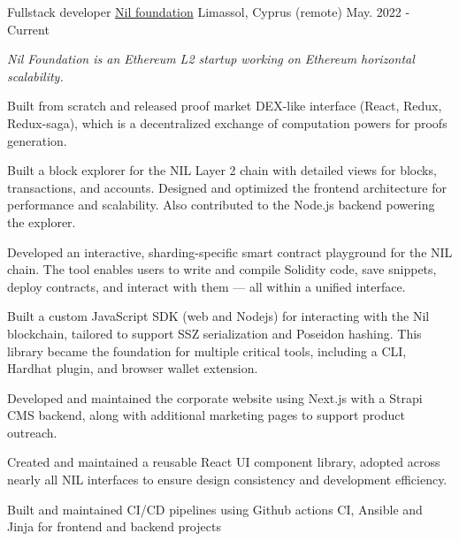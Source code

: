 

\begin{cventries}

  \cventry
    {Fullstack developer} %
    {\href{https://nil.foundation}{Nil foundation}} %
    {Limassol, Cyprus (remote)} %
    {May. 2022 - Current} %
    {
      \begin{cvitems} %
      \vspace{8pt}
      \item[] {\small\textit{Nil Foundation is an Ethereum L2 startup working on Ethereum horizontal scalability.}}
      \vspace{8pt}
        \item {Built from scratch and released proof market DEX-like interface (React, Redux, Redux-saga), which is a decentralized exchange of computation powers for proofs generation.}
        \item {Built a block explorer for the NIL Layer 2 chain with detailed views for blocks, transactions, and accounts. Designed and optimized the frontend architecture for performance and scalability. Also contributed to the Node.js backend powering the explorer.}
        \item {Developed an interactive, sharding-specific smart contract playground for the NIL chain. The tool enables users to write and compile Solidity code, save snippets, deploy contracts, and interact with them — all within a unified interface.}
        \item {Built a custom JavaScript SDK (web and Nodejs) for interacting with the Nil blockchain, tailored to support SSZ serialization and Poseidon hashing. This library became the foundation for multiple critical tools, including a CLI, Hardhat plugin, and browser wallet extension.}
        \item {Developed and maintained the corporate website using Next.js with a Strapi CMS backend, along with additional marketing pages to support product outreach.}
        \item {Created and maintained a reusable React UI component library, adopted across nearly all NIL interfaces to ensure design consistency and development efficiency.}
        \item {Built and maintained CI/CD pipelines using Github actions CI, Ansible and Jinja for frontend and backend projects}
      \end{cvitems}
    }
    {\vspace{16pt}}


\end{cventries}
